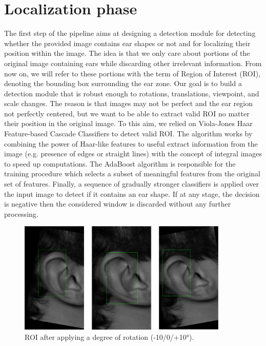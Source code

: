 \documentclass{article}
\begin{document}
\section{Localization phase}

The first step of the pipeline aims at designing a detection module for detecting whether the provided image
contains ear shapes or not and for localizing their position within the image. The idea is that we only care
about portions of the original image containing ears while discarding other irrelevant information.
From now on, we will refer to these portions with the term of Region of Interest (ROI), denoting the bounding
box surrounding the ear zone. Our goal is to build a detection module that is robust enough to rotations,
translations, viewpoint, and scale changes. The reason is that images may not be perfect and the ear region
not perfectly centered, but we want to be able to extract valid ROI no matter their position in the original
image. To this aim, we relied on Viola-Jones Haar Feature-based Cascade Classifiers \cite{conf/cvpr/ViolaJ01}
to detect valid ROI.
The algorithm works by combining the power of Haar-like features to useful extract information from the
image (e.g. presence of edges or straight lines) with the concept of integral images to speed up computations.
The AdaBoost algorithm is responsible for the training procedure which selects a subset of meaningful features
from the original set of features. Finally, a sequence of gradually stronger classifiers is applied over the
input image to detect if it contains an ear shape. If at any stage, the decision is negative then the considered
window is discarded without any further processing.

\begin{figure}[h]
    \begin{center}
        \includegraphics[width=10cm,keepaspectratio]{images/detection.png}
        \caption{ROI after applying a degree of rotation (-10/0/+10°).}
    \end{center}
\end{figure}
\end{document}
